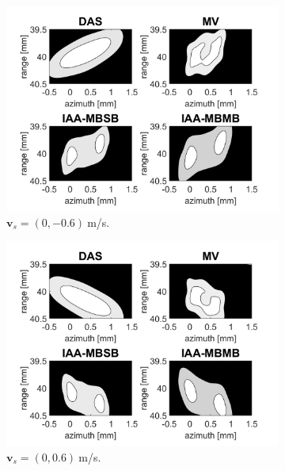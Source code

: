 \begin{figure}[ht]
\begin{subfigure}[t]{0.48\linewidth}
        \includegraphics[width=\linewidth]{./images/results/2.2/motion_90_-06.png}
        \caption{$\boldsymbol{v}_s = (0, -0.6)~$m/s.}
    \end{subfigure}
    \quad
    \begin{subfigure}[t]{0.48\linewidth}
        \includegraphics[width=\linewidth]{./images/results/2.2/motion_90_06.png}
        \caption{$\boldsymbol{v}_s = (0, 0.6)~$m/s.}
    \end{subfigure}
    \quad
    \begin{subfigure}[t]{0.48\linewidth}

\end{subfigure}
\end{figure}
